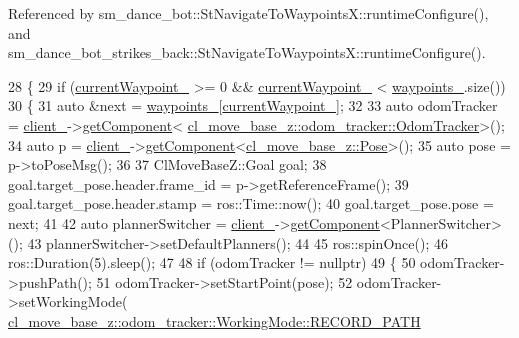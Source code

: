 Referenced by sm\+\_\+dance\+\_\+bot\+::\+St\+Navigate\+To\+Waypoints\+X\+::runtime\+Configure(), and sm\+\_\+dance\+\_\+bot\+\_\+strikes\+\_\+back\+::\+St\+Navigate\+To\+Waypoints\+X\+::runtime\+Configure().


\begin{DoxyCode}
28 \{
29   \textcolor{keywordflow}{if} (\hyperlink{classcl__move__base__z_1_1WaypointNavigator_a82859e418592c2392c20a2d11b9836eb}{currentWaypoint\_} >= 0 && \hyperlink{classcl__move__base__z_1_1WaypointNavigator_a82859e418592c2392c20a2d11b9836eb}{currentWaypoint\_} < 
      \hyperlink{classcl__move__base__z_1_1WaypointNavigator_a727f6a73e15ff5dc6bb3ffdf52c3d832}{waypoints\_}.size())
30   \{
31     \textcolor{keyword}{auto} &next = \hyperlink{classcl__move__base__z_1_1WaypointNavigator_a727f6a73e15ff5dc6bb3ffdf52c3d832}{waypoints\_}[\hyperlink{classcl__move__base__z_1_1WaypointNavigator_a82859e418592c2392c20a2d11b9836eb}{currentWaypoint\_}];
32 
33     \textcolor{keyword}{auto} odomTracker = \hyperlink{classcl__move__base__z_1_1WaypointNavigator_afc5ad5c5d15f41437286b8fca1d3a324}{client\_}->\hyperlink{classsmacc_1_1ISmaccClient_adef78db601749ca63c19e74a27cb88cc}{getComponent}<
      \hyperlink{classcl__move__base__z_1_1odom__tracker_1_1OdomTracker}{cl\_move\_base\_z::odom\_tracker::OdomTracker}>();
34     \textcolor{keyword}{auto} p = \hyperlink{classcl__move__base__z_1_1WaypointNavigator_afc5ad5c5d15f41437286b8fca1d3a324}{client\_}->\hyperlink{classsmacc_1_1ISmaccClient_adef78db601749ca63c19e74a27cb88cc}{getComponent}<\hyperlink{classcl__move__base__z_1_1Pose}{cl\_move\_base\_z::Pose}>();
35     \textcolor{keyword}{auto} pose = p->toPoseMsg();
36 
37     ClMoveBaseZ::Goal goal;
38     goal.target\_pose.header.frame\_id = p->getReferenceFrame();
39     goal.target\_pose.header.stamp = ros::Time::now();
40     goal.target\_pose.pose = next;
41 
42     \textcolor{keyword}{auto} plannerSwitcher = \hyperlink{classcl__move__base__z_1_1WaypointNavigator_afc5ad5c5d15f41437286b8fca1d3a324}{client\_}->\hyperlink{classsmacc_1_1ISmaccClient_adef78db601749ca63c19e74a27cb88cc}{getComponent}<PlannerSwitcher>();
43     plannerSwitcher->setDefaultPlanners();
44 
45     ros::spinOnce();
46     ros::Duration(5).sleep();
47 
48     \textcolor{keywordflow}{if} (odomTracker != \textcolor{keyword}{nullptr})
49     \{
50       odomTracker->pushPath();
51       odomTracker->setStartPoint(pose);
52       odomTracker->setWorkingMode(
      \hyperlink{namespacecl__move__base__z_1_1odom__tracker_ac46b05813b2791604f6cd0a39ace3ef8a023bc3adf68871ef7a0c616765ac80a7}{cl\_move\_base\_z::odom\_tracker::WorkingMode::RECORD\_PATH}

\end{DoxyCode}
